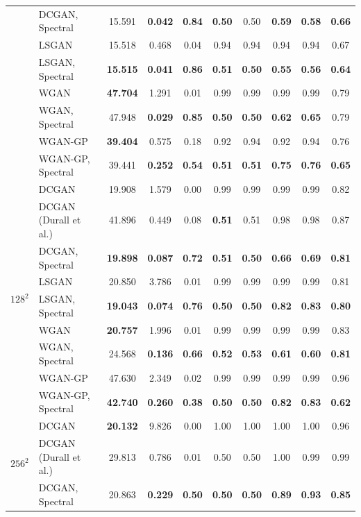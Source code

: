 \documentclass[letterpaper]{article} %
\begin{document}
\begin{table}
\begin{tabular}{l|l|ccc|ccccc}
 & DCGAN, Spectral & 15.591 & {\bf 0.042} & {\bf 0.84}  &{\bf 0.50} &0.50 &{\bf 0.59}&{\bf 0.58}&{\bf 0.66}\\ %
 & LSGAN & 15.518 & 0.468 & 0.04 & 0.94 & 0.94& 0.94 & 0.94&0.67\\
 & LSGAN, Spectral & {\bf 15.515} & {\bf 0.041} & {\bf 0.86}  & {\bf 0.51} & {\bf 0.50} & {\bf 0.55}&{\bf 0.56}&{\bf 0.64}\\ %
 & WGAN & {\bf 47.704} & 1.291 & 0.01 & 0.99&0.99&0.99&0.99&0.79\\
 & WGAN, Spectral & 47.948 & {\bf 0.029} & {\bf 0.85} & {\bf 0.50}&{\bf 0.50} & {\bf 0.62}&{\bf 0.65}&0.79\\ %
 & WGAN-GP & {\bf 39.404} & 0.575 & 0.18 & 0.92&0.94&0.92&0.94&0.76\\
 & WGAN-GP, Spectral & 39.441 & {\bf 0.252} & {\bf 0.54} &{\bf 0.51}&{\bf 0.51}&{\bf 0.75}&{\bf 0.76}&{\bf 0.65}\\ \midrule
\multicolumn{1}{c|}{\multirow{9}{*}{$128^2$}} & DCGAN & 19.908 & 1.579 & 0.00  & 0.99 & 0.99 &0.99&0.99 &0.82\\
& DCGAN (Durall et al.) & 41.896 & 0.449 & 0.08 & \bf{0.51} & 0.51 & 0.98 & 0.98 & 0.87\\
 & DCGAN, Spectral & {\bf 19.898} & {\bf 0.087} & {\bf 0.72} & {\bf 0.51}&{\bf 0.50}&{\bf 0.66}&{\bf 0.69}&{\bf 0.81} \\ %
 & LSGAN & 20.850 & 3.786 & 0.01  & 0.99 &0.99&0.99&0.99&0.81\\
 & LSGAN, Spectral & {\bf 19.043} & {\bf 0.074} & {\bf 0.76} &  {\bf 0.50}& {\bf 0.50} & {\bf 0.82}&{\bf 0.83}&{\bf 0.80}\\ %
 & WGAN & {\bf 20.757} & 1.996 & 0.01& 0.99 & 0.99 & 0.99&0.99 &0.83 \\
 & WGAN, Spectral & 24.568 & {\bf 0.136} & {\bf 0.66} & {\bf 0.52}& {\bf 0.53} &{\bf 0.61} &{\bf 0.60}&{\bf 0.81}\\ %
 & WGAN-GP & 47.630 & 2.349 & 0.02 &  0.99& 0.99 &   0.99& 0.99&0.96\\ 
 & WGAN-GP, Spectral & {\bf 42.740} & {\bf 0.260} & {\bf 0.38}  &  {\bf 0.50}&{\bf 0.50}& {\bf 0.82} & {\bf 0.83}&{\bf 0.62} \\\midrule
\multicolumn{1}{c|}{\multirow{5}{*}{$256^2$}} & DCGAN & {\bf 20.132} & 9.826 & 0.00 & 1.00 & 1.00 & 1.00 & 1.00 & 0.96\\
 & DCGAN (Durall et al.) & 29.813 & 0.786 & 0.01 & 0.50 & 0.50 & 1.00 & 0.99 & 0.99 \\
 & DCGAN, Spectral & 20.863 & {\bf 0.229} & {\bf 0.50}&{\bf 0.50}& {\bf 0.50} &  {\bf 0.89}&{\bf 0.93}&{\bf 0.85} \\ %

\end{tabular}
\end{table}
\end{document}
